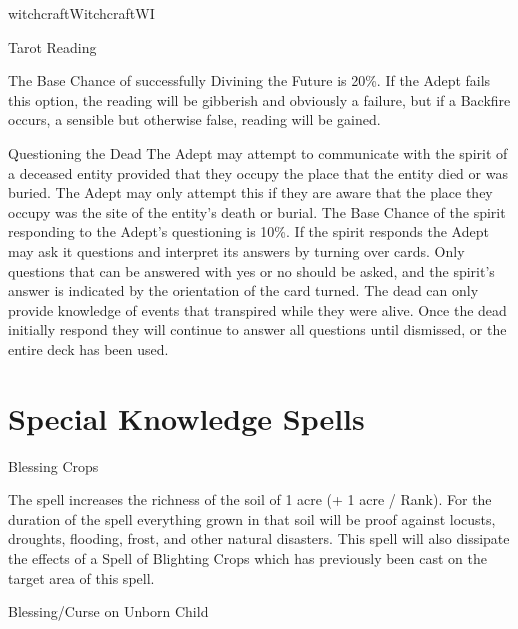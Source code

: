 \begin{College}[1.1]{witchcraft}{Witchcraft}{WI}
\begin{ritual}[Q-2]{Tarot Reading}
\begin{effects}
\begin{Description}
  The Base Chance of successfully Divining the Future is 20\%.  If the
  Adept fails this option, the reading will be gibberish and obviously
  a failure, but if a Backfire occurs, a sensible but otherwise false,
  reading will be gained.

\item[Questioning the Dead] The Adept may attempt to communicate with
  the spirit of a deceased entity provided that they occupy the place
  that the entity died or was buried.  The Adept may only attempt this
  if they are aware that the place they occupy was the site of the
  entity’s death or burial.  The Base Chance of the spirit responding
  to the Adept’s questioning is 10\%. If the spirit responds the Adept
  may ask it questions and interpret its answers by turning over
  cards.  Only questions that can be answered with yes or no should be
  asked, and the spirit’s answer is indicated by the orientation of
  the card turned. The dead can only provide knowledge of events that
  transpired while they were alive.  Once the dead initially respond
  they will continue to answer all questions until dismissed, or the
  entire deck has been used.
\end{Description}
\end{effects}
\end{ritual}


\section{Special Knowledge Spells}

\begin{spell}[S-1]{Blessing Crops}

\begin{effects}
The spell increases the richness of the soil of 1 acre (+ 1 acre /
Rank). For the duration of the spell everything grown in that soil
will be proof against locusts, droughts, flooding, frost, and other
natural disasters.  This spell will also dissipate the effects of a
Spell of Blighting Crops which has previously been cast on the target
area of this spell.
\end{effects}
\end{spell}

\begin{spell}[S-2]{Blessing/Curse on Unborn Child}


\end{spell}
\end{College}
